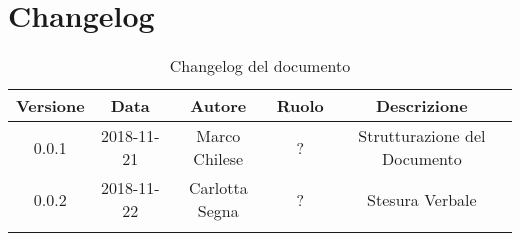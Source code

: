 \newpage

\section{Changelog}

\begin{center}
\begin{longtable}{|c|c|c|c|c|}
\hline
\textbf{Versione} & \textbf{Data} & \textbf{Autore} & \textbf{Ruolo} & \textbf{Descrizione} \\
\hline \hline
\endfirsthead
0.0.1 & 2018-11-21 & Marco Chilese & ? & Strutturazione del Documento \\
0.0.2 & 2018-11-22 & Carlotta Segna & ? & Stesura Verbale \\
\hline
\caption{Changelog del documento}
\end{longtable}
\end{center}
